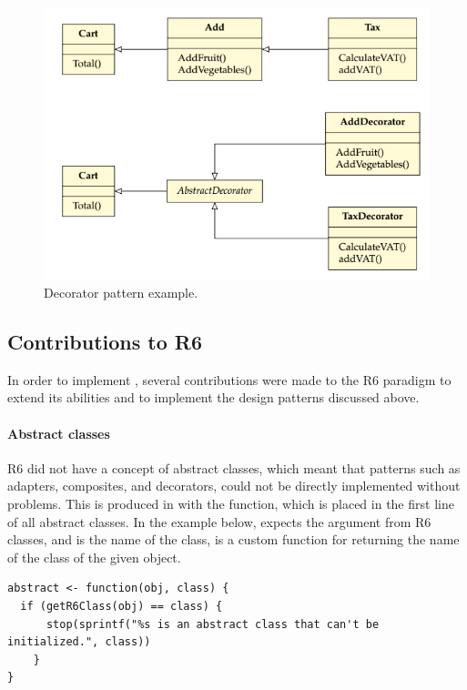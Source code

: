 \begin{figure}[h]
\centering
\includegraphics[scale=0.55]{images/uml_4}
\caption{Decorator pattern example.}
\label{fig:uml_4}
\end{figure}

\subsection{Contributions to R6}
\label{sec:tools_distr6_oop_cont}

In order to implement , several contributions were made to the R6 paradigm to extend its abilities and to implement the design patterns discussed above.

\paragraph{Abstract classes}
R6 did not have a concept of abstract classes, which meant that patterns such as adapters, composites, and decorators, could not be directly implemented without problems. This is produced in  with the  function, which is placed in the first line of all abstract classes. In the example below,  expects the  argument from R6 classes, and  is the name of the class,  is a custom function for returning the name of the class of the given object.

\begin{verbatim}
abstract <- function(obj, class) {
  if (getR6Class(obj) == class) {
      stop(sprintf("%s is an abstract class that can't be initialized.", class))
    }
}
\end{verbatim}

